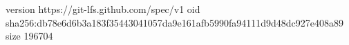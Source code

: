version https://git-lfs.github.com/spec/v1
oid sha256:db78e6d6b3a183f35443041057da9e161afb5990fa94111d9d48dc927e408a89
size 196704
